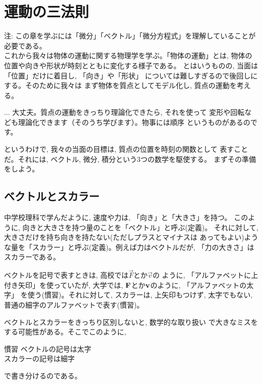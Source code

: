 \chapter{運動の三法則}\label{chapt:motionlaw}

{\small 注: この章を学ぶには「微分」「ベクトル」「微分方程式」を理解していることが必要である。}\\

これから我々は物体の運動に関する物理学を学ぶ。「物体の運動」とは, 
物体の位置や向きや形状が時刻とともに変化する様子である。
とはいうものの, 当面は「位置」だけに着目し, 「向き」や「形状」
については難しすぎるので後回しにする。そのために我々は
まず物体を質点としてモデル化し, 質点の運動を考える。

\begin{faq}{\small{}
... 大丈夫。質点の運動をきっちり理論化できたら, それを使って
変形や回転なども理論化できます（そのうち学びます）。物事には順序
というものがあるのです。}\end{faq}

というわけで, 我々の当面の目標は, 質点の位置を時刻の関数として
表すことだ。それには, ベクトル, 微分, 積分という3つの数学を駆使する。
まずその準備をしよう。\\


\section{ベクトルとスカラー}

中学校理科で学んだように, 速度や力は, 「向き」と「大きさ」を持つ。
このように, 向きと大きさを持つ量のことを「ベクトル」と呼ぶ(定義)。
それに対して, 大きさだけを持ち向きを持たない(ただしプラスとマイナスは
あってもよい)ような量を「スカラー」と呼ぶ(定義)。例えば力はベクトルだが, 
「力の大きさ」はスカラーである。

ベクトルを記号で表すときは, 高校では$\vec{F}$とか$\vec{v}$の
ように, 「アルファベットに上付き矢印」を使っていたが, 大学では, 
${\bf F}$とか${\bf v}$のように, 「アルファベットの太字」
を使う(慣習)。それに対して, スカラーは, 上矢印もつけず, 太字でもない, 
普通の細字のアルファベットで表す(慣習)。

ベクトルとスカラーをきっちり区別しないと, 数学的な取り扱い
で大きなミスをする可能性がある。そこでこのように, 
\begin{itembox}{慣習}
ベクトルの記号は太字\\
スカラーの記号は細字
\end{itembox}
で書き分けるのである。

